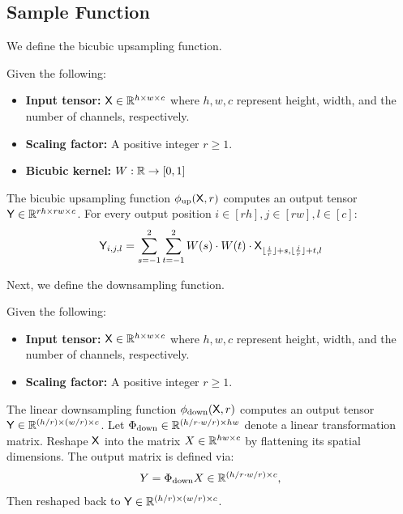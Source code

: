 \subsection{Sample Function}\label{sec:sample_function}
We define the bicubic upsampling function.
\begin{definition}\label{def:bicubic_up_sample_function}
Given the following:
\begin{itemize}
    \item {\bf Input tensor:} $\mathsf{X} \in \mathbb{R}^{h \times w \times c}$ where $h,w,c$ represent height, width, and the number of channels, respectively.
    \item {\bf Scaling factor:} A positive integer $r \geq 1$.
    \item {\bf Bicubic kernel:} $W:\mathbb{R} \to [0,1]$
\end{itemize}
The bicubic upsampling function $\phi_{\mathrm{up}}(\mathsf{X},r)$ computes an output tensor $\mathsf{Y} \in \mathbb{R}^{rh \times rw \times c}$. For every output position $i \in [rh], j \in [rw], l \in [c]$:
\begin{align*}
    \mathsf{Y}_{i,j,l} =  \sum_{s=-1}^2 \sum_{t=-1}^2 W(s) \cdot W(t) \cdot \mathsf{X}_{\lfloor \frac{i}{r}\rfloor+s, \lfloor \frac{j}{r}\rfloor+t,l}
\end{align*}

\end{definition}
Next, we define the downsampling function.
\begin{definition}\label{def:linear_down_sample_function}
Given the following:
\begin{itemize}
    \item {\bf Input tensor:} $\mathsf{X} \in \mathbb{R}^{h \times w \times c}$ where $h,w,c$ represent height, width, and the number of channels, respectively.
    \item {\bf Scaling factor:} A positive integer $r \geq 1$.
\end{itemize}
The linear downsampling function $\phi_{\mathrm{down}}(\mathsf{X},r)$ computes an output tensor $\mathsf{Y} \in \mathbb{R}^{(h/r) \times (w/r) \times c}$. Let $\Phi_{\mathrm{down}} \in \mathbb{R}^{(h/r \cdot w/r) \times hw}$ denote a linear transformation matrix. Reshape $\mathsf{X}$ into the matrix $X \in \mathbb{R}^{hw \times c}$ by flattening its spatial dimensions.  The output matrix is defined via:
\begin{align*}
     Y = \Phi_{\mathrm{down}}X \in \mathbb{R}^{(h/r \cdot w/r) \times c},
\end{align*}
Then reshaped back to $\mathsf{Y} \in \mathbb{R}^{(h/r) \times(w/r) \times c}$.
\end{definition}


